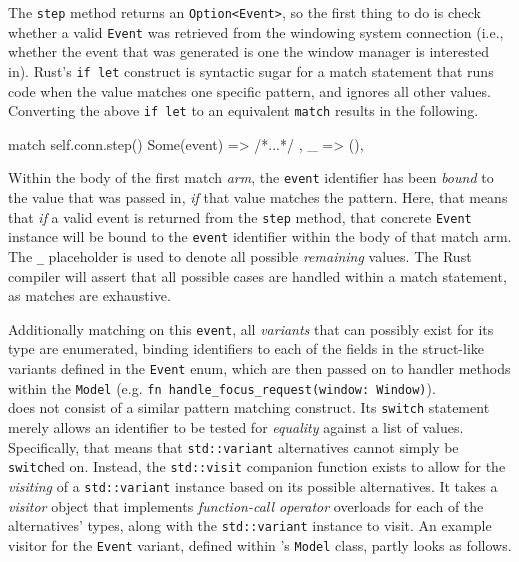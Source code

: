 The  \texttt{step} method  returns an  \texttt{Option<Event>}, so  the
first thing to do is check whether a valid \texttt{Event} was retrieved from the
windowing system connection  (i.e., whether the event that was  generated is one
the window manager is interested in). Rust's \texttt{if let} construct
is syntactic sugar for  a match statement that runs code  when the value matches
one specific pattern, and ignores all other values\cite{therustbook}. Converting
the above  \texttt{if let}  to an  equivalent \texttt{match}
results in the following.

\begin{rustblock}
  match self.conn.step() {
    Some(event) => { /*...*/ },
    _ => (),
  }
\end{rustblock}

Within the body  of the first match \textit{arm},  the \texttt{event} identifier
has been \textit{bound} to the value  that was passed in, \textit{if} that value
matches the pattern\cite{therustbook}. Here, that means that \textit{if} a valid
event is  returned from the  \texttt{step} method, that  concrete \texttt{Event}
instance  will be  bound to  the \texttt{event}  identifier within  the body  of
that  match arm.  The \texttt{\_}  placeholder is  used to  denote all  possible
\textit{remaining} values\cite{therustbook}. The Rust  compiler will assert that
all  possible  cases are  handled  within  a  match  statement, as  matches  are
exhaustive\cite{therustbook}.

Additionally  matching on  this \texttt{event},  all \textit{variants}  that can
possibly  exist for  its type  are enumerated,  binding identifiers  to each  of
the  fields in  the struct-like  variants  defined in  the \texttt{Event}  enum,
which are  then passed  on to  handler methods  within the  \texttt{Model} (e.g.
\texttt{fn handle_focus_request(window: Window)}).\\


\cpp  does   not  consist   of  a  similar   pattern  matching   construct.  Its
\texttt{switch}   statement  merely   allows   an   identifier  to   be
tested   for  \textit{equality}   against  a   list  of   values.  Specifically,
that  means  that   \texttt{std::variant}  alternatives  cannot  simply
be  \texttt{switch}ed  on.  Instead,  the  \texttt{std::visit}
companion  function   exists  to   allow  for   the  \textit{visiting}\cite{go4}
of   a   \texttt{std::variant}   instance   based   on   its   possible
alternatives\cite{stdvisitwrong,  cppstd}. It  takes  a \textit{visitor}  object
that  implements  \textit{function-call  operator}  overloads for  each  of  the
alternatives' types,  along with the \texttt{std::variant}  instance to
visit.  An  example  visitor  for the  \texttt{Event}  variant,  defined  within
\wmcpp's \texttt{Model} class, partly looks as follows.


